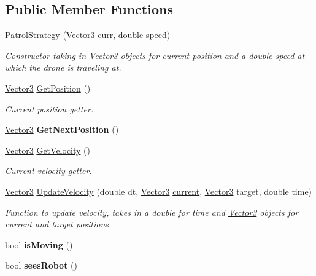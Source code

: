 \subsection*{Public Member Functions}
\begin{DoxyCompactItemize}
\item 
\mbox{\label{classPatrolStrategy_aeaeb0e61d05300c145f6ad00f2bf3106}} 
\hyperlink{classPatrolStrategy_aeaeb0e61d05300c145f6ad00f2bf3106}{Patrol\+Strategy} (\hyperlink{classVector3}{Vector3} curr, double \hyperlink{classPatrolStrategy_af24bc14782cb9d0a6255c80f030a9fc6}{speed})
\begin{DoxyCompactList}\small\item\em Constructor taking in \hyperlink{classVector3}{Vector3} objects for current position and a double speed at which the drone is traveling at. \end{DoxyCompactList}\item 
\hyperlink{classVector3}{Vector3} \hyperlink{classPatrolStrategy_a6feda4df5165aaae0cc7b82aed578c79}{Get\+Position} ()
\begin{DoxyCompactList}\small\item\em Current position getter. \end{DoxyCompactList}\item 
\mbox{\label{classPatrolStrategy_ab6e4fce9b8b0748eff4a6e5c16a0f0ed}} 
\hyperlink{classVector3}{Vector3} {\bfseries Get\+Next\+Position} ()
\item 
\hyperlink{classVector3}{Vector3} \hyperlink{classPatrolStrategy_ae5f750fd8d06de17eb1d6b49ee125011}{Get\+Velocity} ()
\begin{DoxyCompactList}\small\item\em Current velocity getter. \end{DoxyCompactList}\item 
\hyperlink{classVector3}{Vector3} \hyperlink{classPatrolStrategy_ae73db6cc70f328fed21f9df276a64587}{Update\+Velocity} (double dt, \hyperlink{classVector3}{Vector3} \hyperlink{classPatrolStrategy_abab6509593cc5afebd56454e6f11ce27}{current}, \hyperlink{classVector3}{Vector3} target, double time)
\begin{DoxyCompactList}\small\item\em Function to update velocity, takes in a double for time and \hyperlink{classVector3}{Vector3} objects for current and target positions. \end{DoxyCompactList}\item 
\mbox{\label{classPatrolStrategy_a0dcec071144708be35e2c0e1e82af809}} 
bool {\bfseries is\+Moving} ()
\item 
\mbox{\label{classPatrolStrategy_a4a2659e51fb74d999374cb61cedb4d64}} 
bool {\bfseries sees\+Robot} ()
\end{DoxyCompactItemize}
